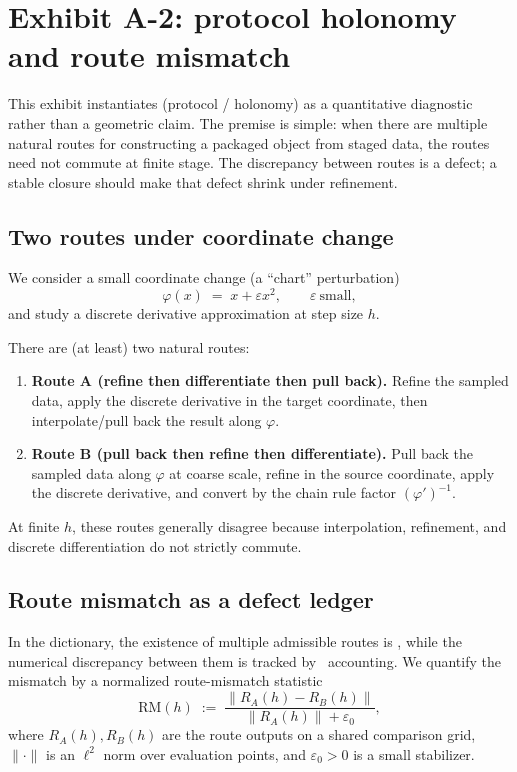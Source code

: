 \section{Exhibit A-2: protocol holonomy and route mismatch}
\label{sec:exhibit-holonomy}

This exhibit instantiates \Pthree (protocol / holonomy) as a quantitative diagnostic rather than a geometric claim.
The premise is simple: when there are multiple natural routes for constructing a packaged object from staged data, the routes need not commute at finite stage.
The discrepancy between routes is a defect; a stable closure should make that defect shrink under refinement.

\subsection{Two routes under coordinate change}
We consider a small coordinate change (a ``chart'' perturbation)
\[
\varphi(x) \;=\; x + \varepsilon x^2,
\qquad \varepsilon\ \text{small},
\]
and study a discrete derivative approximation at step size $h$.

There are (at least) two natural routes:
\begin{enumerate}
  \item \textbf{Route A (refine then differentiate then pull back).}
  Refine the sampled data, apply the discrete derivative in the target coordinate, then interpolate/pull back the result along $\varphi$.
  \item \textbf{Route B (pull back then refine then differentiate).}
  Pull back the sampled data along $\varphi$ at coarse scale, refine in the source coordinate, apply the discrete derivative, and convert by the chain rule factor $(\varphi')^{-1}$.
\end{enumerate}
At finite $h$, these routes generally disagree because interpolation, refinement, and discrete differentiation do not strictly commute.

\subsection{Route mismatch as a defect ledger}
In the \SBT dictionary, the existence of multiple admissible routes is \Pthree, while the numerical discrepancy between them is tracked by \Psix\ accounting.
We quantify the mismatch by a normalized route-mismatch statistic
\begin{equation}\label{eq:rm-def}
\mathrm{RM}(h)
\;:=\;
\frac{\|R_A(h)-R_B(h)\|}{\|R_A(h)\|+\varepsilon_0},
\end{equation}
where $R_A(h),R_B(h)$ are the route outputs on a shared comparison grid, $\|\cdot\|$ is an $\ell^2$ norm over evaluation points, and $\varepsilon_0>0$ is a small stabilizer.

